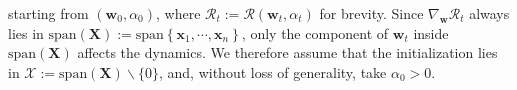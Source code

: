 \documentclass[pdflatex,sn-basic]{sn-jnl}%
\theoremstyle{thmstyleone}%
\begin{document}
starting from $(\mathbf{w}_0, \alpha_0)$, where $\mathcal{R}_t := \mathcal{R} \left(\mathbf{w}_t, \alpha_t\right)$ for brevity. Since $\nabla_{\mathbf{w}} \mathcal{R}_t$ always lies in $\text{span}\left(\mathbf{X}\right) := \text{span} \left\{\mathbf{x}_1, \cdots, \mathbf{x}_n\right\}$, only the component of $\mathbf{w}_t$ inside $\text{span}\left(\mathbf{X}\right)$ affects the dynamics. We therefore assume that the initialization lies in $\mathcal{X} := \text{span} \left(\mathbf{X}\right) \backslash \{0\}$, and, without loss of generality, take $\alpha_0 > 0$. 


\end{document}
